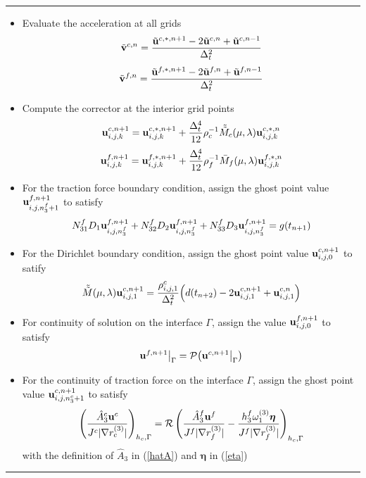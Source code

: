 \documentclass[a4paper]{article}
\makeatletter
\newenvironment{breakablealgorithm}
{%
	\begin{center}
		\refstepcounter{algorithm}%
		\hrule height.8pt depth0pt \kern2pt%
		\renewcommand{\caption}[2][\relax]{%
			{\raggedright\textbf{\ALG@name~\thealgorithm} ##2\par}%
			\ifx\relax##1\relax %
			\addcontentsline{loa}{algorithm}{\protect\numberline{\thealgorithm}##2}%
			\else %
			\addcontentsline{loa}{algorithm}{\protect\numberline{\thealgorithm}##1}%
			\fi
			\kern2pt\hrule\kern2pt
		}
	}{%
		\kern2pt\hrule\relax%
	\end{center}
}
\makeatother
\begin{document}
\begin{breakablealgorithm}
\begin{itemize}
{  }
  \item{Evaluate the acceleration at all grids 
  	\begin{equation*}
  	\tilde{\bf v}^{c,n} = \frac{\tilde{\bf u}^{c,*,n+1}-2\tilde{\bf u}^{c,n}+\tilde{\bf u}^{c,n-1}}{\Delta^2_t}
  	\end{equation*}
  	\begin{equation*}
  	\tilde{\bf v}^{f,n} = \frac{\tilde{\bf u}^{f,*,n+1}-2\tilde{\bf u}^{f,n}+\tilde{\bf u}^{f,n-1}}{\Delta^2_t}
  	\end{equation*}
  }
  \item{Compute the corrector at the interior grid points
  	\begin{equation*}
  	{\bf u}^{c,n+1}_{i,j,k} = {\bf u}^{c,*,n+1}_{i,j,k} + \frac{\Delta_t^4}{12}\rho_c^{-1}\tilde{\tilde{M}}_c(\mu,\lambda) {\bf{u}}^{c,*,n}_{i,j,k}
  	\end{equation*}
  	\begin{equation*}
  		{\bf u}^{f,n+1}_{i,j,k} = {\bf u}^{f,*,n+1}_{i,j,k} + \frac{\Delta_t^4}{12}\rho_f^{-1}\bar{M}_f(\mu,\lambda) {\bf{u}}^{f,*,n}_{i,j,k}
  	\end{equation*}
  }
 \item {For the traction force boundary condition, assign the ghost point value ${\bf u}^{f,n+1}_{i,j,n_3^f+1}$ to satisfy
 		\begin{equation*}
 	N_{31}^fD_1{\bf u}^{f,n+1}_{i,j,n^f_3} + N_{32}^fD_2{\bf u}^{f,n+1}_{i,j,n^f_3} + N_{33}^fD_3{\bf u}^{f,n+1}_{i,j,n^f_3} = g(t_{n+1})
 	\end{equation*}	
 }
 \item {For the Dirichlet boundary condition, assign the ghost point value ${\bf u}^{c,n+1}_{i,j,0}$ to satify
 	\begin{equation*}
 	\tilde{\tilde{M}}(\mu,\lambda){\bf u}_{i,j,1}^{c,n+1} = \frac{\rho^c_{i,j,1}}{\Delta_t^2}\Big(d(t_{n+2})-2{\bf u}_{i,j,1}^{c,n+1}+{\bf u}_{i,j,1}^{c,n}\Big)
 	\end{equation*}
 }
 \item{For continuity of solution on the interface $\Gamma$, assign the value ${\bf u}^{f,n+1}_{i,j,0}$ to satisfy
	\begin{equation*}
	{\bf u}^{f,n+1}\big|_{\Gamma} = \mathcal{P}\big({\bf u}^{c,n+1}\big|_{\Gamma}\big)
	\end{equation*}
}
\item{For the continuity of traction force on the interface $\Gamma$, assign the ghost point value ${\bf u}^{c,n+1}_{i,j,n_3^c+1}$ to satisfy
	\begin{equation}\label{traction_gamma_corr}
	\left(\frac{\hat{A}_3^c{\bf u}^c}{J^c|\nabla r_c^{(3)}|}\right)_{h_c,\Gamma} = \mathcal{R}\left(\frac{\hat{A}_3^f{\bf u}^f}{J^f|\nabla r_f^{(3)}|} - \frac{h_3^f\omega_1^{(3)}{\bm \eta}}{J^f|\nabla r_f^{(3)}|}\right)_{h_c,\Gamma}
	\end{equation}
	with the definition of $\hat{A}_3$ in (\ref{hatA}) and ${\bm \eta}$ in (\ref{eta})
}
	\end{itemize}
\end{breakablealgorithm}
\end{document}

